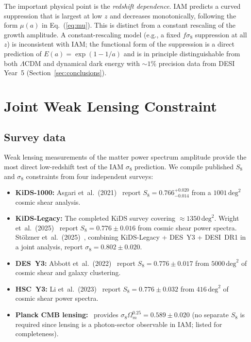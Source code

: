 \documentclass[12pt,a4paper]{article}
\newcommand{\lcdm}{$\Lambda$CDM}
\begin{document}
The important physical point is the \textit{redshift dependence}.
IAM predicts a curved suppression that is largest at low $z$ and
decreases monotonically, following the form $\mu(a)$ in Eq.~(\ref{eq:mu}).
This is distinct from a constant rescaling of the growth amplitude.
A constant-rescaling model (e.g., a fixed $f\sigma_8$ suppression at all $z$)
is inconsistent with IAM; the functional form of the suppression is a
direct prediction of $E(a) = \exp(1-1/a)$ and is in principle distinguishable
from both \lcdm{} and dynamical dark energy with $\sim 1\%$ precision data
from DESI Year~5 (Section~\ref{sec:conclusions}).


\section{Joint Weak Lensing Constraint}
\label{sec:lensing}

\subsection{Survey data}
\label{sec:lensing_data}

Weak lensing measurements of the matter power spectrum amplitude provide
the most direct low-redshift test of the IAM $\sigma_8$ prediction.
We compile published $S_8$ and $\sigma_8$ constraints from four independent
surveys:

\begin{itemize}
\item \textbf{KiDS-1000:} Asgari et~al.\ (2021)~\citep{Asgari2021kids}
  report $S_8 = 0.766^{+0.020}_{-0.014}$ from a $1001\,\mathrm{deg}^2$
  cosmic shear analysis.

\item \textbf{KiDS-Legacy:} The completed KiDS survey covering
  $\approx 1350\,\mathrm{deg}^2$.
  Wright et~al.\ (2025)~\citep{Wright2025kids} report
  $S_8 = 0.776 \pm 0.016$ from cosmic shear power spectra.
  St\"{o}lzner et~al.\ (2025)~\citep{Stolzner2025kids}, combining
  KiDS-Legacy + DES~Y3 + DESI~DR1 in a joint analysis, report
  $\sigma_8 = 0.802 \pm 0.020$.

\item \textbf{DES~Y3:} Abbott et~al.\ (2022)~\citep{Abbott2022desy3}
  report $S_8 = 0.776 \pm 0.017$ from
  $5000\,\mathrm{deg}^2$ of cosmic shear and galaxy clustering.

\item \textbf{HSC~Y3:} Li et~al.\ (2023)~\citep{Li2023hsc}
  report $S_8 = 0.776 \pm 0.032$ from $416\,\mathrm{deg}^2$ of
  cosmic shear power spectra.

\item \textbf{Planck CMB lensing:}~\citet{Planck2018lens} provides
  $\sigma_8\Omega_m^{0.25} = 0.589 \pm 0.020$ (no separate $S_8$
  is required since lensing is a photon-sector observable in IAM;
  listed for completeness).
\end{itemize}
\end{document}
